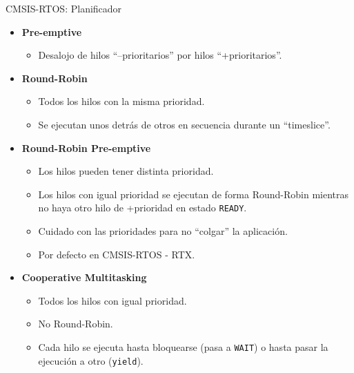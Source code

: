 \begin{frame}{CMSIS-RTOS: Planificador}
    \begin{itemize}
      \item \textbf{Pre-emptive}
          \begin{itemize}
            \item Desalojo de hilos “–prioritarios” por hilos “+prioritarios”.
          \end{itemize}
      \item \textbf{Round-Robin}
          \begin{itemize}
            \item Todos los hilos con la misma prioridad.
            \item Se ejecutan unos detrás de otros en secuencia durante un “timeslice”.
      \end{itemize}
      \item \textbf{Round-Robin Pre-emptive}
          \begin{itemize}
            \item Los hilos pueden tener distinta prioridad.
            \item Los hilos con igual prioridad se ejecutan de forma Round-Robin mientras no haya otro hilo de +prioridad en estado \texttt{READY}.
            \item Cuidado con las prioridades para no “colgar” la aplicación.
            \item Por defecto en CMSIS-RTOS - RTX.
      \end{itemize}
      \item \textbf{Cooperative Multitasking}
          \begin{itemize}
            \item Todos los hilos con igual prioridad.
            \item No Round-Robin.
            \item Cada hilo se ejecuta hasta bloquearse (pasa a \texttt{WAIT}) o hasta pasar la ejecución a otro (\texttt{yield}).
          \end{itemize}
    \end{itemize}
\end{frame}


